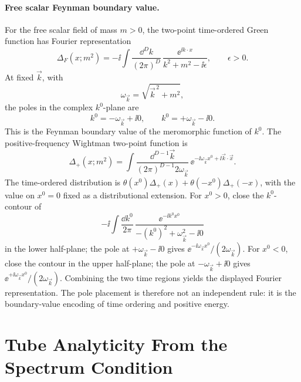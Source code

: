 \paragraph{Free scalar Feynman boundary value.}
For the free scalar field of mass \(m>0\), the two-point time-ordered Green
function has Fourier representation
\[
  \Delta_F(x;m^2)
  =
  -\ii
  \int \frac{\dd^D k}{(2\pi)^D}\,
  \frac{\ee^{\ii k\cdot x}}{k^2+m^2-\ii\epsilon},
  \qquad
  \epsilon>0.
\]
At fixed \(\vec k\), with
\[
  \omega_{\vec k}=\sqrt{\vec k^{\,2}+m^2},
\]
the poles in the complex \(k^0\)-plane are
\[
  k^0=-\omega_{\vec k}+\ii0,
  \qquad
  k^0=+\omega_{\vec k}-\ii0 .
\]
This is the Feynman boundary value of the meromorphic function of \(k^0\).
The positive-frequency Wightman two-point function is
\[
  \Delta_+(x;m^2)
  =
  \int\frac{\dd^{D-1}\vec k}{(2\pi)^{D-1}2\omega_{\vec k}}\,
  \ee^{-\ii\omega_{\vec k}x^0+\ii\vec k\cdot\vec x}.
\]
The time-ordered distribution is
\(\theta(x^0)\Delta_+(x)+\theta(-x^0)\Delta_+(-x)\), with the value on
\(x^0=0\) fixed as a distributional extension.  For \(x^0>0\), close the
\(k^0\)-contour of
\[
  -\ii\int\frac{\dd k^0}{2\pi}\,
  \frac{\ee^{-\ii k^0x^0}}{-(k^0)^2+\omega_{\vec k}^2-\ii0}
\]
in the lower half-plane; the pole at \(+\omega_{\vec k}-\ii0\) gives
\(\ee^{-\ii\omega_{\vec k}x^0}/(2\omega_{\vec k})\).  For \(x^0<0\), close
the contour in the upper half-plane; the pole at
\(-\omega_{\vec k}+\ii0\) gives
\(\ee^{+\ii\omega_{\vec k}x^0}/(2\omega_{\vec k})\).  Combining the two time
regions yields the displayed Fourier representation.  The pole placement is
therefore not an independent rule: it is the boundary-value encoding of time
ordering and positive energy.

\section{Tube Analyticity From the Spectrum Condition}

